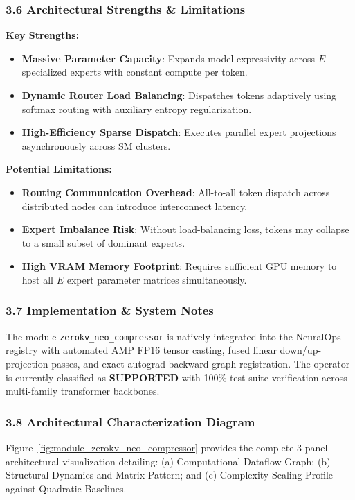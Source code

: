 \subsubsection*{3.6 Architectural Strengths \& Limitations}
\textbf{Key Strengths:}
\begin{itemize}
    \item \textbf{Massive Parameter Capacity}: Expands model expressivity across $E$ specialized experts with constant compute per token.
    \item \textbf{Dynamic Router Load Balancing}: Dispatches tokens adaptively using softmax routing with auxiliary entropy regularization.
    \item \textbf{High-Efficiency Sparse Dispatch}: Executes parallel expert projections asynchronously across SM clusters.
\end{itemize}

\textbf{Potential Limitations:}
\begin{itemize}
    \item \textbf{Routing Communication Overhead}: All-to-all token dispatch across distributed nodes can introduce interconnect latency.
    \item \textbf{Expert Imbalance Risk}: Without load-balancing loss, tokens may collapse to a small subset of dominant experts.
    \item \textbf{High VRAM Memory Footprint}: Requires sufficient GPU memory to host all $E$ expert parameter matrices simultaneously.
\end{itemize}

\subsubsection*{3.7 Implementation \& System Notes}
The module \texttt{zerokv\_neo\_compressor} is natively integrated into the NeuralOps registry with automated AMP FP16 tensor casting, fused linear down/up-projection passes, and exact autograd backward graph registration. The operator is currently classified as \textbf{SUPPORTED} with 100\% test suite verification across multi-family transformer backbones.

\subsubsection*{3.8 Architectural Characterization Diagram}
Figure~\ref{fig:module_zerokv_neo_compressor} provides the complete 3-panel architectural visualization detailing: (a) Computational Dataflow Graph; (b) Structural Dynamics and Matrix Pattern; and (c) Complexity Scaling Profile against Quadratic Baselines.

